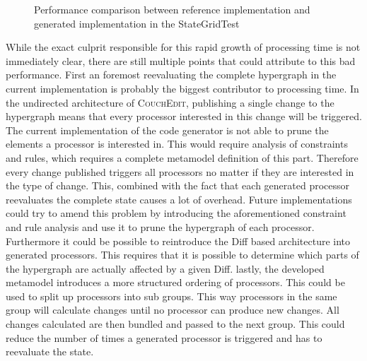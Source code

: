 \begin{figure}
  \centering
  \caption{Performance comparison between reference implementation and generated implementation in the StateGridTest}
  \label{fig:performance}
\end{figure}

While the exact culprit responsible for this rapid growth of processing time is not immediately clear, there are still multiple points that could attribute to this bad performance. First an foremost reevaluating the complete hypergraph in the current implementation is probably the biggest contributor to processing time. In the undirected architecture of \textsc{CouchEdit}, publishing a single change to the hypergraph means that every processor interested in this change will be triggered. The current implementation of the code generator is not able to prune the elements a processor is interested in. This would require analysis of constraints and rules, which requires a complete metamodel definition of this part. Therefore every change published triggers all processors no matter if they are interested in the type of change. This, combined with the fact that each generated processor reevaluates the complete state causes a lot of overhead. Future implementations could try to amend this problem by introducing the aforementioned constraint and rule analysis and use it to prune the hypergraph of each processor. Furthermore it could be possible to reintroduce the Diff based architecture into generated processors. This requires that it is possible to determine which parts of the hypergraph are actually affected by a given Diff. lastly, the developed metamodel introduces a more structured ordering of processors. This could be used to split up processors into sub groups. This way processors in the same group will calculate changes until no processor can produce new changes. All changes calculated are then bundled and passed to the next group. This could reduce the number of times a generated processor is triggered and has to reevaluate the state.

